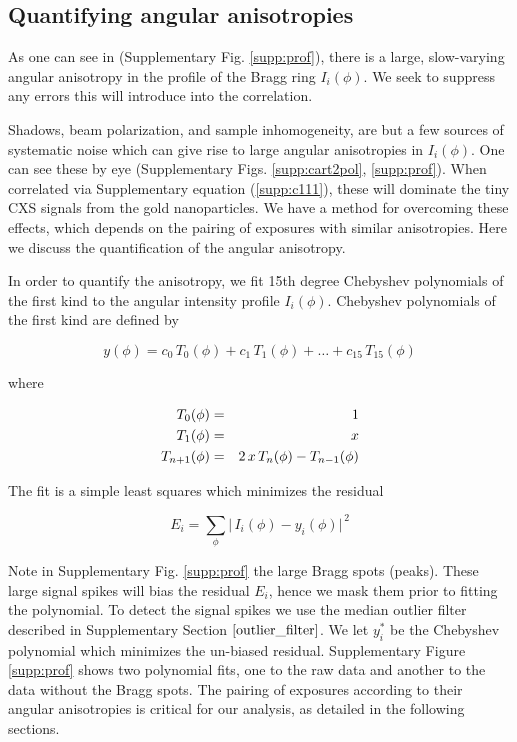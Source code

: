 \documentclass [12pt,fleqn]{article}
\begin{document}
\subsection{Quantifying angular anisotropies}
As one can see in (Supplementary Fig. \ref{supp:prof}), there is a large, slow-varying angular anisotropy in the profile of the Bragg ring $I_i(\phi)$. We seek to suppress any errors this will introduce into the correlation. 

Shadows, beam polarization, and sample inhomogeneity, are but a few sources of systematic noise which can give rise to large angular anisotropies in $I_i(\phi)$. One can see these by eye (Supplementary Figs. \ref{supp:cart2pol}, \ref{supp:prof}). When correlated via Supplementary equation (\ref{supp:c111}), these will dominate the tiny CXS signals from the gold nanoparticles. We have a method for overcoming these effects, which depends on the pairing of exposures with similar anisotropies. Here we discuss the quantification of the angular anisotropy.

In order to quantify the anisotropy, we fit 15th degree Chebyshev polynomials of the first kind to the angular intensity profile $I_i(\phi)$. Chebyshev polynomials of the first kind are defined by

\begin{equation}
y(\phi) = c_0\,T_0(\phi) + c_1\,T_1(\phi) + \dots + c_{15} \, T_{15}(\phi) 
\end{equation}

where

\begin{eqnarray}
T_0(\phi) &=& 1 \nonumber\cr
T_1(\phi) &=& x \nonumber \cr
T_{n+1}(\phi) &=& 2\,x\,T_n(\phi) - T_{n-1}(\phi) \nonumber
\end{eqnarray}

The fit is a simple least squares which minimizes the residual

\begin{equation} \label{supp:fit}
E_i =  \sum_{\phi} \big |\, I_i(\phi) - y_i(\phi)\big |^{\,2}
\end{equation}

Note in Supplementary Fig. \ref{supp:prof} the large Bragg spots (peaks). These large signal spikes will bias the residual $E_i$, hence we mask them prior to fitting the polynomial. To detect the signal spikes we use the median outlier filter described in Supplementary Section $\ref{outlier_filter}$. We let $y^*_i$ be the Chebyshev polynomial which minimizes the un-biased residual. Supplementary Figure \ref{supp:prof} shows two polynomial fits, one to the raw data and another to the data without the Bragg spots. The pairing of exposures according to their angular anisotropies is critical for our analysis, as detailed in the following sections.
\end{document}
